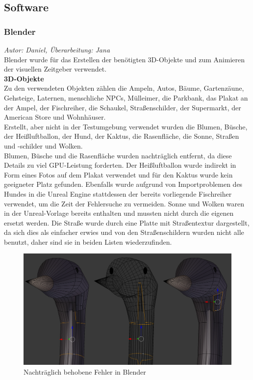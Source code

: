 \documentclass{Bericht}
\begin{document}
\subsection{Software}
\label{sec:software}
\subsubsection{Blender}
\textit{Autor: Daniel, Überarbeitung: Jana}\\
Blender wurde für das Erstellen der benötigten 3D-Objekte und zum Animieren der visuellen Zeitgeber verwendet.\\

\textbf{3D-Objekte}\\
Zu den verwendeten Objekten zählen die Ampeln, Autos, Bäume, Gartenzäune, Gehsteige, Laternen, menschliche NPCs, Mülleimer, die Parkbank, das Plakat an der Ampel, der Fischreiher, die Schaukel, Straßenschilder, der Supermarkt, der American Store und Wohnhäuser.\\
Erstellt, aber nicht in der Testumgebung verwendet wurden die Blumen, Büsche, der Heißluftballon, der Hund, der Kaktus, die Rasenfläche, die Sonne, Straßen und -schilder und Wolken.\\
		Blumen, Büsche und die Rasenfläche wurden nachträglich entfernt, da diese Details zu viel GPU-Leistung forderten. Der Heißluftballon wurde indirekt in Form eines Fotos auf dem Plakat verwendet und für den Kaktus wurde kein geeigneter Platz gefunden. Ebenfalls wurde aufgrund von Importproblemen des Hundes in die Unreal Engine stattdessen der bereits vorliegende Fischreiher verwendet, um die Zeit der Fehlersuche zu vermeiden.
 		Sonne und Wolken waren in der Unreal-Vorlage bereits enthalten und mussten nicht durch die eigenen ersetzt werden. 
		Die Straße wurde durch eine Platte mit Straßentextur dargestellt, da sich dies als einfacher erwies und von den Straßenschildern wurden nicht alle benutzt, daher sind sie in beiden Listen wiederzufinden.\\

		\begin{figure}[H] %
			\centering
			\includegraphics[height=\textheight, width=\linewidth, keepaspectratio, angle=0]{../Bilder/Heron_Problem.png} %
			\caption{Nachträglich behobene Fehler in Blender}
			\label{img:heron-error}
		\end{figure}
\end{document}
